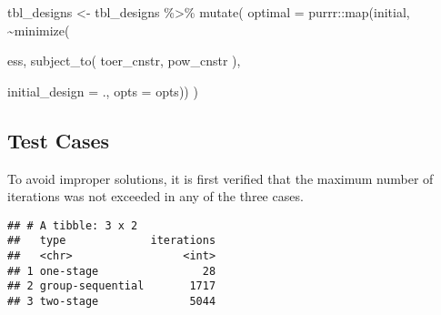 \documentclass[
]{book}
\newenvironment{Shaded}{\begin{snugshade}}{\end{snugshade}}
\newcommand{\AttributeTok}[1]{\textcolor[rgb]{0.77,0.63,0.00}{#1}}
\newcommand{\FunctionTok}[1]{\textcolor[rgb]{0.00,0.00,0.00}{#1}}
\newcommand{\NormalTok}[1]{#1}
\newcommand{\OtherTok}[1]{\textcolor[rgb]{0.56,0.35,0.01}{#1}}
\newcommand{\SpecialCharTok}[1]{\textcolor[rgb]{0.00,0.00,0.00}{#1}}
\begin{document}
\begin{Shaded}
\begin{Highlighting}[]
\NormalTok{tbl\_designs }\OtherTok{\textless{}{-}}\NormalTok{ tbl\_designs }\SpecialCharTok{\%\textgreater{}\%} 
    \FunctionTok{mutate}\NormalTok{(}
       \AttributeTok{optimal =}\NormalTok{ purrr}\SpecialCharTok{::}\FunctionTok{map}\NormalTok{(initial, }\SpecialCharTok{\textasciitilde{}}\FunctionTok{minimize}\NormalTok{(}
         
\NormalTok{          ess,}
          \FunctionTok{subject\_to}\NormalTok{(}
\NormalTok{              toer\_cnstr,}
\NormalTok{              pow\_cnstr}
\NormalTok{          ),}
          
          \AttributeTok{initial\_design =}\NormalTok{ ., }
          \AttributeTok{opts           =}\NormalTok{ opts)) )}
\end{Highlighting}
\end{Shaded}

\hypertarget{test-cases-14}{%
\subsection{Test Cases}\label{test-cases-14}}

To avoid improper solutions, it is first verified that the maximum
number of iterations was not exceeded in any of the three cases.

\begin{Shaded}
\end{Shaded}

\begin{verbatim}
## # A tibble: 3 x 2
##   type             iterations
##   <chr>                 <int>
## 1 one-stage                28
## 2 group-sequential       1717
## 3 two-stage              5044
\end{verbatim}
\end{document}
